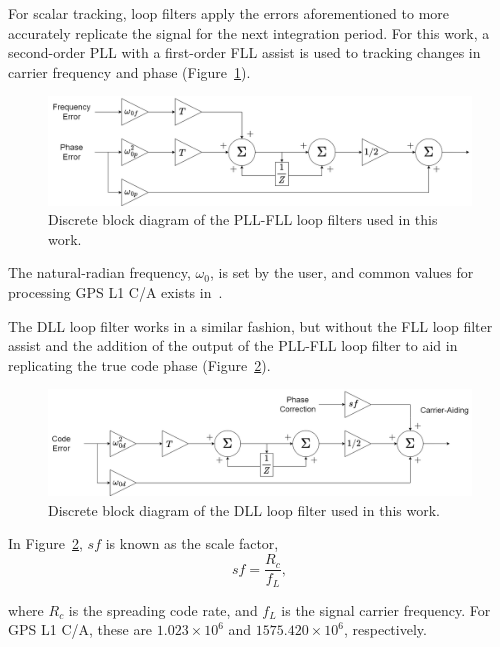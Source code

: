 For scalar tracking, loop filters apply the errors aforementioned to more accurately replicate the signal for the next integration period. For this work, a second-order PLL with a first-order FLL assist is used to tracking changes in carrier frequency and phase (Figure~\ref{fig:PLL}).

\begin{figure}[!ht]\label{fig:PLL}
    \centering
    \includegraphics[width=\linewidth]{Figures/PLL.png}
    \caption{Discrete block diagram of the PLL-FLL loop filters used in this work.}
\end{figure}

The natural-radian frequency, \(\omega_0\), is set by the user, and common values for processing GPS L1 C/A exists in~\cite{kaplanUnderstandingGPSPrinciples2006}.

The DLL loop filter works in a similar fashion, but without the FLL loop filter assist and the addition of the output of the PLL-FLL loop filter to aid in replicating the true code phase (Figure~\ref{fig:DLL}).

\begin{figure}[!ht]\label{fig:DLL}
    \centering
    \includegraphics[width=\linewidth]{Figures/DLL.png}
    \caption{Discrete block diagram of the DLL loop filter used in this work.}
\end{figure}

In Figure~\ref{fig:DLL}, \(sf\) is known as the scale factor,
\begin{equation}\label{eq:sf}
    sf = \frac{R_c}{f_L},
\end{equation}

where \(R_c\) is the spreading code rate, and \(f_L\) is the signal carrier frequency. For GPS L1 C/A, these are \(1.023 \times 10^6\) and \(1575.420 \times 10^6\), respectively.

